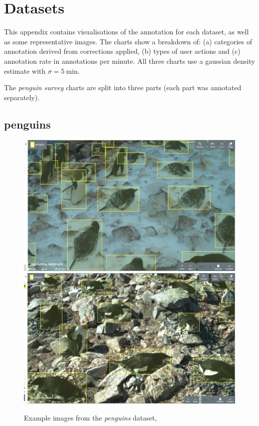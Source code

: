 \chapter{Datasets}
\label{chap:datasets} 

This appendix contains visualisations of the annotation for each dataset, as well as some representative images. The charts show a breakdown of: (a) categories of annotation derived from corrections applied, (b) types of user actions and (c) annotation rate in annotations per minute. All three charts use a gaussian density estimate with $\sigma=\SI{5}{\minute}$. 

The \emph{penguin survey} charts are split into three parts (each part was annotated separately).

\newpage
\section{penguins}
\label{sec:penguins_details}

\begin{figure}[!h]
\centering
  \includegraphics[width=0.475\linewidth]{figures/annotation/screenshots/penguins.png}
  \hfill
  \includegraphics[width=0.475\linewidth]{figures/annotation/screenshots/penguins2.png}

\caption{Example images from the \emph{penguins} dataset, \cite{PenguinData}}
\label{fig:penguin_dataset}
\end{figure}


